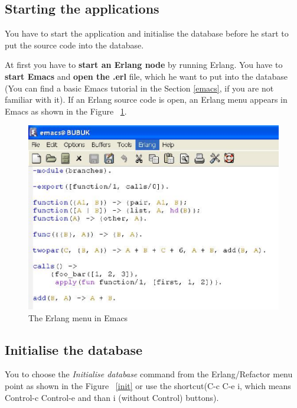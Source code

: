 \documentclass[12pt]{article}
\begin{document}
\subsection{Starting the applications}

You have to start the application and initialise the database before he start to put the source code into the database.


At first you have to {\bf start an Erlang node} by running Erlang.
You have to {\bf start Emacs} and {\bf open the .erl} file, which he want to put into the database 
(You can find a basic Emacs tutorial in the Section \ref{emacs}, if you are not familiar with it).
If an Erlang source code is open, an Erlang menu appears in Emacs as shown in the Figure ~\ref{newmenu}.

\begin{center}
\begin{figure}[htbp]
    
    \includegraphics[scale=0.80]{newmenu.eps}
   \caption{The Erlang menu in Emacs}
  \label{newmenu}
\end{figure}
\end{center}



\subsection{Initialise the database}

You to choose the {\it Initialise database} command from the Erlang/Refactor menu point as shown in the Figure ~\ref{init} or use the shortcut(C-c C-e i, which means Control-c Control-e and than i (without Control) buttons).
\end{document}
